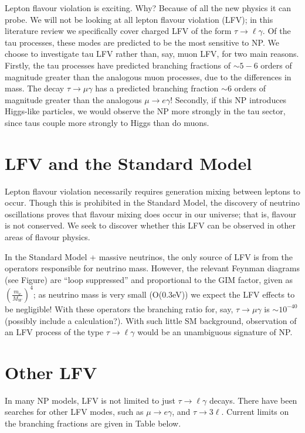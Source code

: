 \documentclass[12pt,a4paper]{article} %
\newcommand{\tmg}{\tau\to\mu\gamma}
\newcommand{\tlg}{\tau\to\ell\gamma}
\begin{document}
Lepton flavour violation is exciting. Why? Because of all the new physics it can probe. We will not be looking at all lepton flavour violation (LFV); in this literature review we specifically cover charged LFV of the form $\tlg$. Of the tau processes, these modes are predicted to be the most sensitive to NP. We choose to investigate tau LFV rather than, say, muon LFV, for two main reasons. Firstly, the tau processes have predicted branching fractions of $\sim 5 - 6$ orders of magnitude greater than the analogous muon processes, due to the differences in mass. The decay $\tmg$ has a predicted branching fraction $\sim 6$ orders of magnitude greater than the analogous $\mu\to e \gamma$! Secondly, if this NP introduces Higgs-like particles, we would observe the NP more strongly in the tau sector, since taus couple more strongly to Higgs than do muons.

\section{LFV and the Standard Model}

Lepton flavour violation necessarily requires generation mixing between leptons to occur. Though this is prohibited in the Standard Model, the discovery of neutrino oscillations proves that flavour mixing does occur in our universe; that is, flavour is not conserved. We seek to discover whether this LFV can be observed in other areas of flavour physics.

In the Standard Model + massive neutrinos, the only source of LFV is from the operators responsible for neutrino mass. However, the relevant Feynman diagrams (see Figure) are ``loop suppressed'' and proportional to the GIM factor, given as $\left(\frac{m_\nu}{M_W}\right)^4$; as neutrino mass is very small (O(0.3eV)) we expect the LFV effects to be negligible! With these operators the branching ratio for, say, $\tmg$ is $\sim 10^{-40}$ (possibly include a calculation?). With such little SM background, observation of an LFV process of the type $\tlg$ would be an unambiguous signature of NP.

\section{Other LFV}

In many NP models, LFV is not limited to just $\tlg$ decays. There have been searches for other LFV modes, such as $\mu\to e \gamma$, and $\tau\to 3\ell$. Current limits on the branching fractions are given in Table below.
\end{document}
